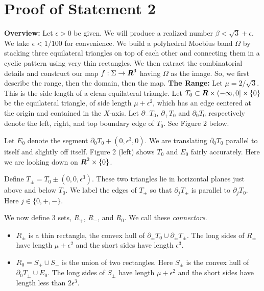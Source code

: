 \documentclass[12pt]{article}
\def\R{\mbox{\boldmath{$R$}}}%
\begin{document}
\section{Proof of Statement 2}

{\bf Overview:\/}
  Let $\epsilon>0$ be given. 
We will produce a realized number $\beta<\sqrt
3+\epsilon$.  We take $\epsilon<1/100$ for convenience.
We build a polyhedral Moebius band $\Omega$ by
stacking three equilateral triangles on top of each other
and connecting them in a cyclic pattern using very thin
rectangles.   We then extract the combinatorial details
and construct our map $f: \Sigma \to \R^3$ having
$\Omega$ as the image.  So, we first describe the
range, then the domain, then the map.
\newline
\newline
{\bf The Range:\/}
Let $\mu=2/\sqrt 3$.
This is the side length of a clean equilateral triangle.
Let
$T_0 \subset \R \times (-\infty,0] \times \{0\}$ be the equilateral triangle,
of side length $\mu + \epsilon^2$, which
has an edge centered at the origin and contained in
the $X$-axis.  Let $\partial_- T_0$, $\partial_+T_0$ and
$\partial_0T_0$ respectively denote the left, right, and
top boundary edge of $T_0$.   See Figure 2 below.

Let $E_0$ denote the segment
$\partial_0 T_0 + (0,\epsilon^3,0)$.
We are translating $\partial_0T_0$ parallel to
itself and slightly off itself.
Figure 2 (left) shows $T_0$ and $E_0$ fairly
accurately.  Here we are looking down on $\R^2 \times \{0\}$.

Define $T_{\pm} = T_0 \pm (0,0,\epsilon^3)$.
These two triangles lie in horizontal planes just above and below
$T_0$.  We label the edges of $T_{\pm}$ so that
$\partial_j T_{\pm}$ is parallel to $\partial_j T_0$.
Here $j \in \{0,+,-\}$.

We now define $3$ sets, $R_+$, $R_-$, and $R_0$.  We call these {\it connectors\/}.
\begin{itemize}
  \item $R_{\pm}$ is a thin rectangle, the convex hull of
    $\partial_{\pm} T_0 \cup \partial_{\pm} T_{\pm}$.   The long
    sides of $R_{\pm}$ have length $\mu+\epsilon^2$ and the short
    sides have length $\epsilon^3$.
  \item $R_0=S_+ \cup S_-$ is the union of two rectangles.
    Here $S_{\pm}$ is the    convex
    hull of $\partial_0 T_{\pm} \cup E_0$.
    The long sides of $S_{\pm}$ have length $\mu+\epsilon^2$ and the short
    sides have length less than $2 \epsilon^3$.
  \end{itemize}
\end{document}
